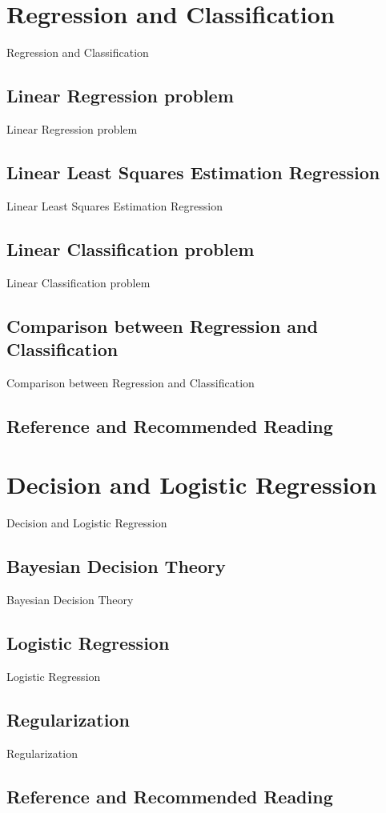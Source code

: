\documentclass[a4paper,12pt]{article}
\begin{document}
\clearpage
\section{Regression and Classification}
Regression and Classification
\subsection{Linear Regression problem}
Linear Regression problem
\subsection{Linear Least Squares Estimation Regression}
Linear Least Squares Estimation Regression
\subsection{Linear Classification problem}
Linear Classification problem
\subsection{Comparison between Regression and Classification}
Comparison between Regression and Classification
\subsection{Reference and Recommended Reading}

\clearpage
\section{Decision and Logistic Regression}
Decision and Logistic Regression
\subsection{Bayesian Decision Theory}
Bayesian Decision Theory
\subsection{Logistic Regression}
Logistic Regression
\subsection{Regularization}
Regularization
\subsection{Reference and Recommended Reading}
\end{document}
